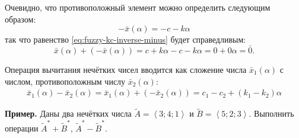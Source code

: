 Очевидно, что противоположный элемент можно определить следующим образом:
\begin{equation*}
  -\bar{x}\left( \alpha  \right)=-c-k\alpha
\end{equation*}
так что равенство \eqref{eq:fuzzy-kc-inverse-minus} будет справедливым:
\begin{equation*}
	\bar{x}\left( \alpha  \right)+\left( -\bar{x}\left( \alpha  \right) \right)=c+k\alpha -c-k\alpha =0+0\alpha =\bar{0}.
\end{equation*}

Операция вычитания нечётких чисел вводится как сложение числа $\bar{x}_1\left(\alpha \right)$ с числом, противоположным числу $\bar{x}_2\left( \alpha  \right)$:
\begin{gather*}
  \bar{x}_1\left(\alpha \right)-\bar{x}_2\left(\alpha \right)=\bar{x}_1\left(\alpha \right)+\left(-\bar{x}_2\left(\alpha \right) \right)=c_1-c_2+\left( k_1-k_2 \right)\alpha
\end{gather*}

\textbf{Пример.} Даны два нечётких числа $\tilde A=\left\langle 3;4;1 \right\rangle $ и $\tilde B=\left\langle 5;2;3 \right\rangle$. Выполнить операции $\tilde A^{*}+ \tilde B^{*}$, $\tilde A^{*}-\tilde B^{*}$.

